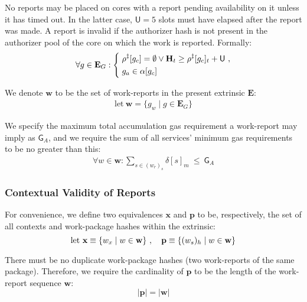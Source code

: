 No reports may be placed on cores with a report pending availability on it unless it has timed out. In the latter case, $\mathsf{U} = 5$ slots must have elapsed after the report was made. A report is invalid if the authorizer hash is not present in the authorizer pool of the core on which the work is reported. Formally:
\begin{equation}\label{eq:reportcoresareunusedortimedout}
  \forall g \in \mathbf{E}_G :\left\{\;\begin{aligned}
    &\rho^\ddagger[g_c] = \none \vee \mathbf{H}_t \ge \rho^\ddagger[g_c]_t + \mathsf{U}\ , \\
    &g_a \in \alpha[g_c]
  \end{aligned}\right.
\end{equation}

We denote $\mathbf{w}$ to be the set of work-reports in the present extrinsic $\mathbf{E}$:
\begin{align}
  \text{let}\ \mathbf{w} = \{ g_w \mid g \in \mathbf{E}_G \}
\end{align}

We specify the maximum total accumulation gas requirement a work-report may imply as $\mathsf{G}_A$, and we require the sum of all services' minimum gas requirements to be no greater than this:
\begin{align}
  \forall w \in \mathbf{w}: \sum_{s \in (w_r)_s}{\delta[s]_m}\ \le\ \mathsf{G}_A
\end{align}












\subsubsection{Contextual Validity of Reports}\label{sec:contextualvalidity}

For convenience, we define two equivalences $\mathbf{x}$ and $\mathbf{p}$ to be, respectively, the set of all contexts and work-package hashes within the extrinsic:
\begin{equation}
    \text{let } \mathbf{x} \equiv \{ w_x \mid w \in \mathbf{w} \}\ ,\quad
    \mathbf{p} \equiv \{ (w_s)_h \mid w \in \mathbf{w} \}
\end{equation}

There must be no duplicate work-package hashes (\ie two work-reports of the same package). Therefore, we require the cardinality of $\mathbf{p}$ to be the length of the work-report sequence $\mathbf{w}$:
\begin{equation}
  |\mathbf{p}| = |\mathbf{w}|
\end{equation}

